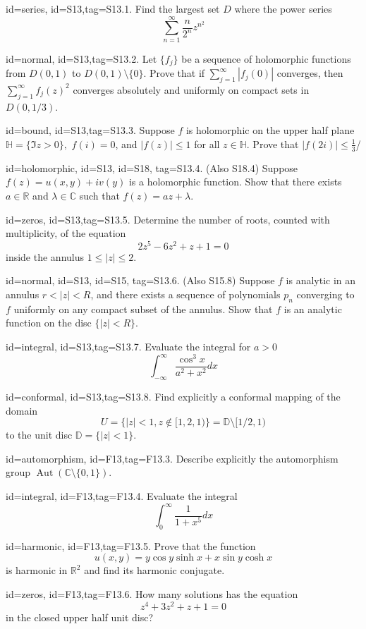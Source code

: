 \documentclass[12pt,letterpaper]{article}
\theoremstyle{plain}
\theoremstyle{definition}
\DeclareMathOperator{\Aut}{Aut}
\begin{document}
{%


\item[id=series, id=S13,tag=S13.1.]
Find the largest set $D$ where the power series
\[
	\sum_{n=1}^{\infty} \frac{n}{2^n} z^{n^2}
\]
\item[id=normal, id=S13,tag=S13.2.]
Let $\{f_j\}$ be a sequence of holomorphic functions from $D(0,1)$ to $D(0,1) \setminus \{0\}$. Prove that if $\sum_{j=1}^{\infty} | f_j(0) |$ converges, then $\sum_{j=1}^{\infty} f_j(z)^2$ converges absolutely and uniformly on compact sets in $D(0,1/3)$.

\item[id=bound, id=S13,tag=S13.3.]
Suppose $f$ is holomorphic on the upper half plane $\mathbb{H} = \{\Im z > 0\},$ $f(i) = 0$, and $| f(z) | \le 1$ for all $z \in \mathbb{H}$. Prove that $| f(2i) | \le \frac{1}{3}$/

\item[id=holomorphic, id=S13, id=S18, tag=S13.4.]
(Also S18.4) Suppose $f(z) = u(x,y) + iv(y)$ is a holomorphic function. Show that there exists $a \in \mathbb{R}$ and $\lambda \in \mathbb{C}$ such that $f(z) = az + \lambda$.

\item[id=zeros, id=S13,tag=S13.5.]
Determine the number of roots, counted with multiplicity, of the equation
\[
	2z^5 - 6z^2 + z + 1 =0
\]
inside the annulus $1 \le | z | \le 2$.

\item[id=normal, id=S13, id=S15, tag=S13.6.]
(Also S15.8) Suppose $f$ is analytic in an annulus $r < | z | < R$, and there exists a sequence of polynomials $p_n$ converging to $f$ uniformly on any compact subset of the annulus. Show that $f$ is an analytic function on the disc $\{| z | < R\}$.
\item[id=integral, id=S13,tag=S13.7.]
Evaluate the integral for $a > 0$
\[
	\int_{-\infty}^{\infty} \frac{\cos^3x}{a^2 + x^2} dx
\]
\item[id=conformal, id=S13,tag=S13.8.]
Find explicitly a conformal mapping of the domain
\[
	U = \{| z | < 1, z \notin [1,2,1) \} = \mathbb{D} \setminus [1/2,1)
\]
to the unit disc $\mathbb{D} = \{| z | < 1\}.$


\item[id=automorphism, id=F13,tag=F13.3.]
Describe explicitly the automorphism group $\Aut(\mathbb{C} \setminus \{0,1\})$.
\item[id=integral, id=F13,tag=F13.4.]
Evaluate the integral
\[
	\int_{0}^{\infty} \frac{1}{1+x^5} dx
\]
\item[id=harmonic, id=F13,tag=F13.5.]
Prove that the function
\[
	u(x,y) = y \cos y \sinh x + x \sin y \cosh x
\]
is harmonic in $\mathbb{R}^2$ and find its harmonic conjugate.
\item[id=zeros, id=F13,tag=F13.6.]
How many solutions has the equation
\[
	z^4 + 3z^2 + z + 1 = 0
\]
in the closed upper half unit disc?

}
\end{document}
